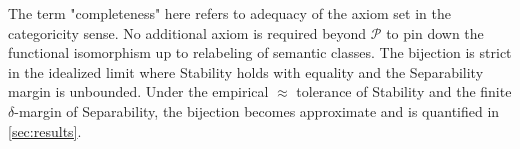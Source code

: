 \begin{remark}
The term "completeness" here refers to adequacy of the axiom set in the categoricity sense. No additional axiom is required beyond $\mathcal{P}$ to pin down the functional isomorphism up to relabeling of semantic classes. The bijection is strict in the idealized limit where Stability holds with equality and the Separability margin is unbounded. Under the empirical $\approx$ tolerance of Stability and the finite $\delta$-margin of Separability, the bijection becomes approximate and is quantified in \cref{sec:results}.
\end{remark}